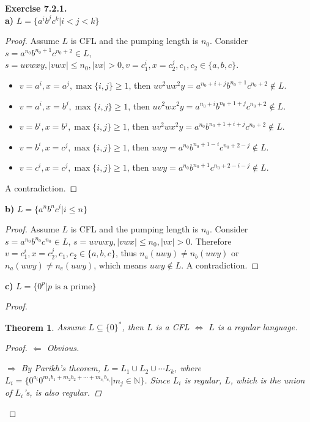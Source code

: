 \documentclass[a4paper]{article}
\newtheorem{theorem}{Theorem}
\newtheorem*{proof}{Proof}
\newenvironment{exercise}[1]{
	\par
	\noindent\textbf{Exercise #1.}\quad
}{
	\par
	\bigskip
}
\newcommand{\Nset}{\mathbb{N}}
\begin{document}
\begin{exercise}{7.2.1} \hspace{0pt}\\
\textbf{a)} $L=\{a^ib^jc^k|i<j<k\}$
    \begin{proof}
        Assume $L$ is CFL and the pumping length is $n_0$.
        Consider $s=a^{n_0}b^{n_0+1}c^{n_0+2}\in L$, $s=uvwxy,|vwx|\leqslant n_0,|vx|>0,v=c_1^i,x=c_2^j,c_1,c_2\in\{a,b,c\}$.
        \begin{itemize}
            \item $v=a^i,x=a^j,\max\{i,j\}\geqslant 1$, then $uv^2wx^2y=a^{n_0+i+j}b^{n_0+1}c^{n_0+2}\notin L$.
            \item $v=a^i,x=b^j,\max\{i,j\}\geqslant 1$, then $uv^2wx^2y=a^{n_0+i}b^{n_0+1+j}c^{n_0+2}\notin L$.
            \item $v=b^i,x=b^j,\max\{i,j\}\geqslant 1$, then $uv^2wx^2y=a^{n_0}b^{n_0+1+i+j}c^{n_0+2}\notin L$.
            \item $v=b^i,x=c^j,\max\{i,j\}\geqslant 1$, then $uwy=a^{n_0}b^{n_0+1-i}c^{n_0+2-j}\notin L$.
            \item $v=c^i,x=c^j,\max\{i,j\}\geqslant 1$, then $uwy=a^{n_0}b^{n_0+1}c^{n_0+2-i-j}\notin L$.
        \end{itemize}
        A contradiction.
    \end{proof}
\textbf{b)} $L=\{a^nb^nc^i|i\leqslant n\}$
    \begin{proof}
        Assume $L$ is CFL and the pumping length is $n_0$.
        Consider $s=a^{n_0}b^{n_0}c^{n_0}\in L$, $s=uvwxy,|vwx|\leqslant n_0,|vx|>0$.
        Therefore $v=c_1^i,x=c_2^j,c_1,c_2\in\{a,b,c\}$, thus $n_a(uwy)\neq n_b(uwy)$ or $n_a(uwy)\neq n_c(uwy)$,
        which means $uwy\notin L$.
        A contradiction.
    \end{proof}
\textbf{c)} $L=\{0^p|p \text{ is a prime}\}$
    \begin{proof}
        \begin{theorem}\label{sp2}
            Assume $L\subseteq\{0\}^*$, then $L$ is a CFL $\Leftrightarrow$ $L$ is a regular language.
            \begin{proof}
                $\Leftarrow$ Obvious.\par
                $\Rightarrow$ By \textit{Parikh's theorem}, $L=L_1\cup L_2\cup \cdots L_k$, where
                $L_i=\{0^{a_i}0^{m_1b_1+m_2b_2+\cdots+m_{c_i}b_{c_i}}|m_j\in\Nset\}$.
                Since $L_i$ is regular, $L$, which is the union of $L_i$'s,
                is also regular.
            \end{proof}

\end{theorem}
\end{proof}
\end{exercise}
\end{document}
